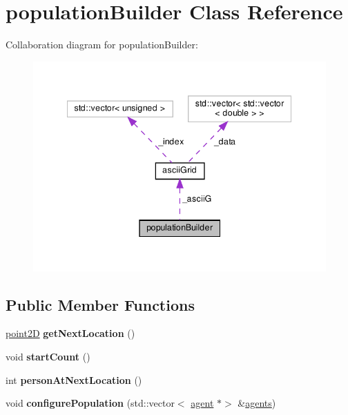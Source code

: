 \hypertarget{classpopulationBuilder}{}\section{population\+Builder Class Reference}
\label{classpopulationBuilder}


Collaboration diagram for population\+Builder\+:
\nopagebreak
\begin{figure}[H]
\begin{center}
\leavevmode
\includegraphics[width=342pt]{classpopulationBuilder__coll__graph}
\end{center}
\end{figure}
\subsection*{Public Member Functions}
\begin{DoxyCompactItemize}
\item 
\mbox{\label{classpopulationBuilder_a464b444e7d17fcdcce70753eb71791d1}} 
\mbox{\hyperlink{classpoint2D}{point2D}} {\bfseries get\+Next\+Location} ()
\item 
\mbox{\label{classpopulationBuilder_aefaffd4d8bdadd7f1ff58e604095a9b0}} 
void {\bfseries start\+Count} ()
\item 
\mbox{\label{classpopulationBuilder_a5a288f060298983de16fc85972614a3a}} 
int {\bfseries person\+At\+Next\+Location} ()
\item 
\mbox{\label{classpopulationBuilder_a64f8562892260879b013d8b07cd2727e}} 
void {\bfseries configure\+Population} (std\+::vector$<$ \mbox{\hyperlink{classagent}{agent}} $\ast$$>$ \&\mbox{\hyperlink{classagents}{agents}})
\end{DoxyCompactItemize}
